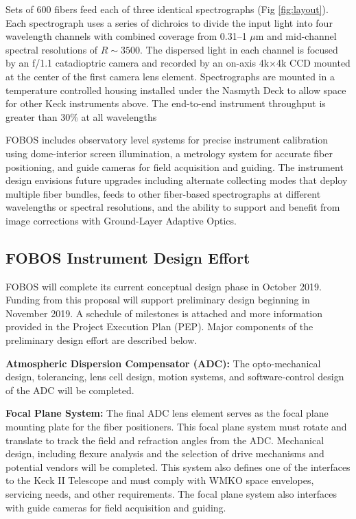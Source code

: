 \documentclass[oneside,11pt]{amsart}
\newcommand{\comment}[2][todo]{{\color{#1}[[{\bf #2}]]}}
\begin{document}
Sets of 600 fibers feed each of three identical spectrographs (Fig
\ref{fig:layout}).  Each spectrograph uses a series of dichroics to
divide the input light into four wavelength channels with combined
coverage from 0.31--1 $\mu$m and mid-channel spectral resolutions of $R
\sim 3500$.  The dispersed light in each channel is focused by an f/1.1
catadioptric camera and recorded by an on-axis 4k$\times$4k CCD mounted
at the center of the first camera lens element.  Spectrographs are
mounted in a temperature controlled housing installed under the Nasmyth
Deck to allow space for other Keck instruments above.  The end-to-end
instrument throughput is greater than 30\% at all wavelengths

FOBOS includes observatory level systems for precise instrument
calibration using dome-interior screen illumination, a metrology system
for accurate fiber positioning, and guide cameras for field acquisition
and guiding.  The instrument design envisions future upgrades including
alternate collecting modes that deploy multiple fiber bundles, feeds to
other fiber-based spectrographs at different wavelengths or spectral
resolutions, and the ability to support and benefit from image
corrections with Ground-Layer Adaptive Optics.

\subsection{FOBOS Instrument Design Effort}
\label{sec:design}

FOBOS will complete its current conceptual design phase in October 2019.
Funding from this proposal will support preliminary design beginning in
November 2019.  A schedule of milestones is attached and more
information provided in the Project Execution Plan (PEP).  Major
components of the preliminary design effort are described below.

\noindent \textbf{Atmospheric Dispersion Compensator (ADC):} The
opto-mechanical design, tolerancing, lens cell design, motion systems,
and software-control design of the ADC will be completed.  

\noindent \textbf{Focal Plane System:} The final ADC lens element serves
as the focal plane mounting plate for the fiber positioners.  This focal
plane system must rotate and translate to track the field and refraction
angles from the ADC.  Mechanical design, including flexure analysis and
the selection of drive mechanisms and potential vendors will be
completed.  This system also defines one of the interfaces to the Keck
II Telescope and must comply with WMKO space envelopes, servicing needs,
and other requirements.  The focal plane system also interfaces with
guide cameras for field acquisition and guiding.
\end{document}
